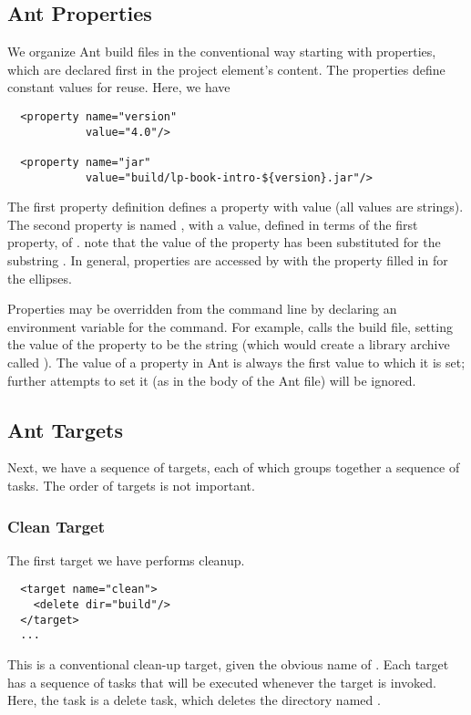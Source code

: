 \subsection{Ant Properties}\label{section:intro-ant-properties}

We organize Ant build files in the conventional way starting with
properties, which are declared first in the project element's content.
The properties define constant values for reuse.  Here, we have
%
\begin{verbatim}
  <property name="version"
            value="4.0"/>

  <property name="jar"
            value="build/lp-book-intro-${version}.jar"/>
\end{verbatim}
%
The first property definition defines a property  with
value  (all values are strings).  The second property is
named , with a value, defined in terms of the first property,
of .  note that the value of the
property  has been substituted for the substring .
In general, properties are accessed by
 with the property filled in for the ellipses.

Properties may be overridden from the command line by declaring
an environment variable for the command.  For example,
%
%
calls the build file, setting the value of the 
property to be the string  (which would create a library
archive called ).  The value of a property in Ant is
always the first value to which it is set; further attempts to set it
(as in the body of the Ant file) will be ignored.


\subsection{Ant Targets}

Next, we have a sequence of targets, each of which groups together
a sequence of tasks.  The order of targets is not important.  

\subsubsection{Clean Target}

The first target we have performs cleanup.
%
\begin{verbatim}
  <target name="clean">
    <delete dir="build"/>
  </target>
  ...
\end{verbatim}
%
This is a conventional clean-up target, given the obvious name of
.  Each target has a sequence of tasks that will be
executed whenever the target is invoked.  Here, the task
is a delete task, which deletes the directory named .

